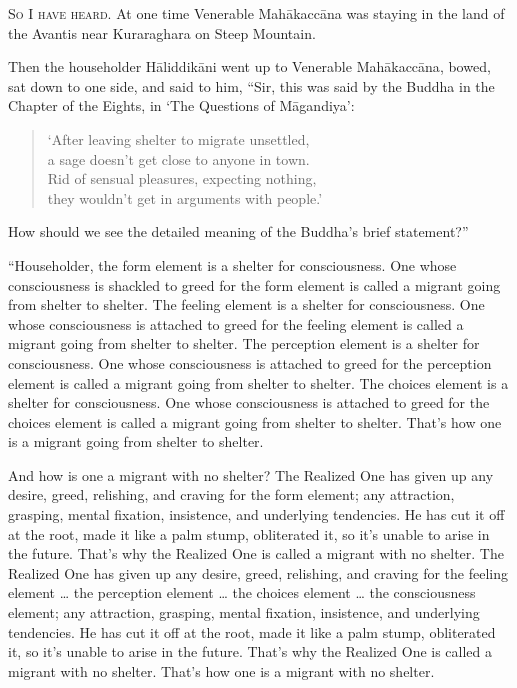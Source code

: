\documentclass[12pt,openany]{book}%
\newcommand*{\scevam}[1]{\textsc{#1}}
\begin{document}
\scevam{So I have heard. }At one time Venerable \textsanskrit{Mahākaccāna} was staying in the land of the Avantis near Kuraraghara on Steep Mountain. 

Then the householder \textsanskrit{Hāliddikāni} went up to Venerable \textsanskrit{Mahākaccāna}, bowed, sat down to one side, and said to him, “Sir, this was said by the Buddha in the Chapter of the Eights, in ‘The Questions of \textsanskrit{Māgandiya}’: 

\begin{verse}%
‘After leaving shelter to migrate unsettled, \\
a sage doesn’t get close to anyone in town. \\
Rid of sensual pleasures, expecting nothing, \\
they wouldn’t get in arguments with people.’ 

%
\end{verse}

How should we see the detailed meaning of the Buddha’s brief statement?” 

“Householder, the form element is a shelter for consciousness. One whose consciousness is shackled to greed for the form element is called a migrant going from shelter to shelter. The feeling element is a shelter for consciousness. One whose consciousness is attached to greed for the feeling element is called a migrant going from shelter to shelter. The perception element is a shelter for consciousness. One whose consciousness is attached to greed for the perception element is called a migrant going from shelter to shelter. The choices element is a shelter for consciousness. One whose consciousness is attached to greed for the choices element is called a migrant going from shelter to shelter. That’s how one is a migrant going from shelter to shelter. 

And how is one a migrant with no shelter? The Realized One has given up any desire, greed, relishing, and craving for the form element; any attraction, grasping, mental fixation, insistence, and underlying tendencies. He has cut it off at the root, made it like a palm stump, obliterated it, so it’s unable to arise in the future. That’s why the Realized One is called a migrant with no shelter. The Realized One has given up any desire, greed, relishing, and craving for the feeling element … the perception element … the choices element … the consciousness element; any attraction, grasping, mental fixation, insistence, and underlying tendencies. He has cut it off at the root, made it like a palm stump, obliterated it, so it’s unable to arise in the future. That’s why the Realized One is called a migrant with no shelter. That’s how one is a migrant with no shelter. 
\end{document}
